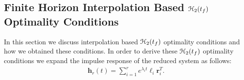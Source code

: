 \documentclass[preprint]{elsarticle}
\theoremstyle{definition}
\theoremstyle{definition}
\def\mathcal{\EuScript}
\numberwithin{equation}{section}
\newcommand{\A}{\mathbf{A}}
\newcommand{\B}{\mathbf{B}}
\newcommand{\C}{\mathbf{C}}
\newcommand{\h}{\mathbf{h}}
\newcommand{\tf}{t_f}
\newcommand{\rc}{\boldsymbol{r}}
\newcommand{\lc}{\boldsymbol{\ell}}
\newcommand{\ch}{\mathcal{H}}
\newcommand{\cp}{\mathcal{P}}
\newcommand{\cl}{\mathcal{L}}
\newcommand{\cq}{\mathcal{Q}}
\newcommand{\norm}[1]{\left\lVert#1\right\rVert}
\newcommand{\cbfH}{\mbox{\boldmath${\EuScript{H}}$} }
\newcommand{\cbfB}{\mbox{${\EuScript{B}}$}}
\newcommand{\cbfC}{\mbox{${\EuScript{C}}$}}
\begin{document}

\subsection{Finite Horizon Interpolation Based $\ch_2(\tf)$ Optimality Conditions}
In this section we discuss interpolation based $\ch_2(\tf)$ optimality conditions and how we obtained these conditions. In order to derive these $\ch_2(\tf)$ optimality conditions we expand the impulse response of the reduced system as follows:
\begin{equation}\label{kernel}
\begin{aligned}
\h_r(t)=\sum_{i=1}^r e^{\lambda_it}\lc_i\rc_i^T.
\end{aligned}
\end{equation}
\end{document}
